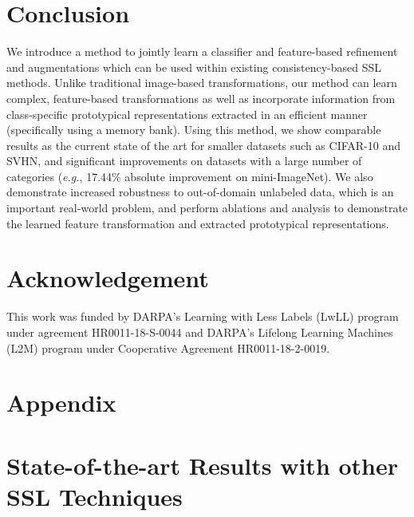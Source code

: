 \documentclass[runningheads]{llncs}
\begin{document}
 \section{Conclusion}
We introduce a method to jointly learn a classifier and feature-based refinement and augmentations which can be used within existing consistency-based SSL methods. Unlike traditional image-based transformations, our method can learn complex, feature-based transformations as well as incorporate information from class-specific prototypical representations extracted in an efficient manner (specifically using a memory bank). Using this method, we show comparable results as the current state of the art for smaller datasets such as CIFAR-10 and SVHN, and significant improvements on datasets with a large number of categories (\textit{e.g.}, 17.44\% absolute improvement on mini-ImageNet). We also demonstrate increased robustness to out-of-domain unlabeled data, which is an important real-world problem, and perform ablations and analysis to demonstrate the learned feature transformation and extracted prototypical representations.




\section{Acknowledgement}
This work was funded by DARPA's Learning with Less Labels (LwLL) program under agreement HR0011-18-S-0044 and DARPA’s Lifelong Learning Machines (L2M) program under Cooperative Agreement HR0011-18-2-0019. 
\clearpage



\section*{Appendix}
\appendix

\renewcommand{\thesection}{\Alph{section}}

\section{State-of-the-art Results with other SSL Techniques}
\end{document}
